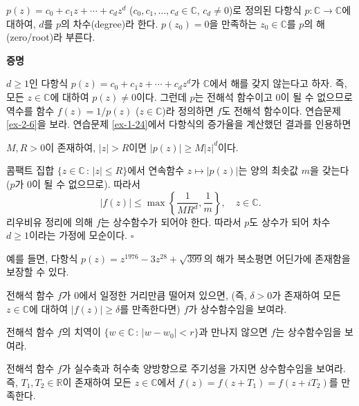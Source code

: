 $p(z) = c_0 + c_1z + \cdots + c_dz^d$ 
($c_0, c_1, \ldots, c_d\in \mathbb C$, $c_d\ne0$)로 정의된
다항식 $p:\mathbb C \to \mathbb C$에 대하여,
$d$를 $p$의 차수(degree)라 한다. 
$p(z_0)=0$을 만족하는 $z_0\in \mathbb C$를 $p$의 해(zero/root)라 부른다.

{\bf 증명}

$d\ge1$인 다항식 $p(z) = c_0 + c_1z + \cdots + c_dz^d$가
$\mathbb C$에서 해를 갖지 않는다고 하자.
즉, 모든 $z\in\mathbb C$에 대하여 $p(z)\ne0$이다.
그런데 $p$는 전해석 함수이고 $0$이 될 수 없으므로 역수를 
함수 $f(z) = 1/p(z)$ ($z\in\mathbb C$)라 정의하면
$f$도 전해석 함수이다. 연습문제 \ref{ex-2-6}을 보라.
연습문제 \ref{ex-1-24}에서 다항식의 증가율을 계산했던 결과를 인용하면
\begin{center}
$M,R>0$이 존재하여, $|z|>R$이면 $|p(z)|\ge M|z|^d$이다.
\end{center}
콤팩트 집합 $\{z\in\mathbb C\,:\, |z|\le R\}$에서
연속함수 $z\mapsto |p(z)|$는 양의 최솟값 $m$을 갖는다 ($p$가 $0$이 될 수 없으므로).
따라서
\[
|f(z)| \le \max\left\{ \dfrac1{MR^d}, \dfrac1m \right\}, \quad z\in\mathbb C.
\]
리우비유 정리에 의해 $f$는 상수함수가 되어야 한다.
따라서 $p$도 상수가 되어 차수 $d\ge1$이라는 가정에 모순이다.
\hfill $\square$

예를 들면, 다항식 $p(z) = z^{1976} -3z^{28} + \sqrt{399}$의 해가
복소평면 어딘가에 존재함을 보장할 수 있다.

\begin{salt_exercise} \label{ex-3-30}
전해석 함수 $f$가 $0$에서 일정한 거리만큼 떨어져 있으면,
(즉, $\delta>0$가 존재하여 모든 $z\in\mathbb C$에 대하여 $|f(z)|\ge\delta$를 만족한다면)
$f$가 상수함수임을 보여라.
\end{salt_exercise}

\begin{salt_exercise} \label{ex-3-31}
전해석 함수 $f$의 치역이 $\{ w\in\mathbb C\,:\, |w-w_0| < r\}$과 만나지 않으면
$f$는 상수함수임을 보여라.
\end{salt_exercise}

\begin{salt_exercise} \label{ex-3-32}
전해석 함수 $f$가 실수축과 허수축 양방향으로 주기성을 가지면 상수함수임을 보여라.
즉, $T_1, T_2\in \mathbb R$이 존재하여 
모든 $z\in \mathbb C$에서 $f(z) = f(z+T_1) =f(z+iT_2)$를 만족한다.
\end{salt_exercise}

